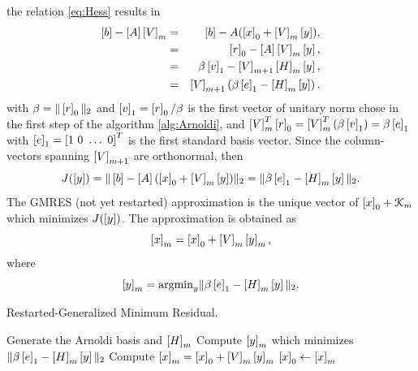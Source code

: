 \noindent the relation \eqref{eq:Hess} results in
\begin{eqnarray*}
\left[{{b}}\right] - \left[A\right] \left[V\right]_m &= &\left[{{b}}\right] - {A}(\left[{{x}}\right]_0 + \left[V\right]_m \left[{{y}}\right]),\\
&= & \left[{{r}}\right]_0 - \left[A\right] \left[V\right]_m \left[{{y}}\right],\\
&= & \beta\left[{{v}}\right]_1 - \left[V\right]_{m+1} \left[H\right]_m \left[{{y}}\right],\\
&= & \left[V\right]_{m+1} \left( \beta\left[{{e}}\right]_1 - \left[H\right]_m \left[{{y}}\right]\right).
\end{eqnarray*}
\noindent with $\beta = \Vert \left[{{r}}\right]_0 \Vert_2$ and $\left[{{v}}\right]_1 = \left[{{r}}\right]_0/\beta$ is the first vector of unitary norm chose in the first step of the algorithm \ref{alg:Arnoldi}, and $\left[V\right]_m^T\left[{{r}}\right]_0 = \left[V\right]_m^T(\beta\left[{{v}}\right]_1) = \beta\left[{{e}}\right]_1$ with $\left[{{e}}\right]_1 = \left[{{1 \ 0 \ \ldots \ 0}}\right]^T$ is the first standard basis vector. Since the column-vectors spanning $\left[V\right]_{m+1}$ are orthonormal, then
$$J(\left[{{y}}\right]) = \Vert \left[{{b}}\right] - \left[A\right] (\left[{{x}}\right]_0 + \left[V\right]_m \left[{{y}}\right])\Vert_2 = \Vert \beta\left[{{e}}\right]_1 - \left[H\right]_m \left[{{y}}\right] \Vert_2.$$
\noindent The GMRES \cite{saad1986gmres} (not yet restarted) approximation is the unique vector of $\left[{{x}}\right]_0 + \mathcal{K}_m$  which minimizes $J(\left[{{y}}\right])$. The approximation is obtained as $$\left[{{x}}\right]_m = \left[{{x}}\right]_0 + \left[V\right]_m \left[{{y}}\right]_m,$$ where $$\left[{{y}}\right]_m = \mathrm{argmin}_y \Vert \beta\left[{{e}}\right]_1 - \left[H\right]_m \left[{{y}}\right] \Vert_2.$$
%
\begin{algorithm}[ht!]
\begin{algorithmic}
\caption{Restarted-Generalized Minimum Residual.}
\label{alg:rGMRES}
	\State Generate the Arnoldi basis and $\left[H\right]_m$
	\State Compute $\left[{{y}}\right]_m$ which minimizes $\Vert \beta\left[{{e}}\right]_1 - \left[H\right]_m \left[{{y}}\right] \Vert_2$ 
	\State Compute $\left[{{x}}\right]_m = \left[{{x}}\right]_0 + \left[V\right]_m \left[{{y}}\right]_m$
	\EndFor
	\State $\left[{{x}}\right]_0 \gets \left[{{x}}\right]_m$ 
\EndWhile
\end{algorithmic}
\end{algorithm}
%

